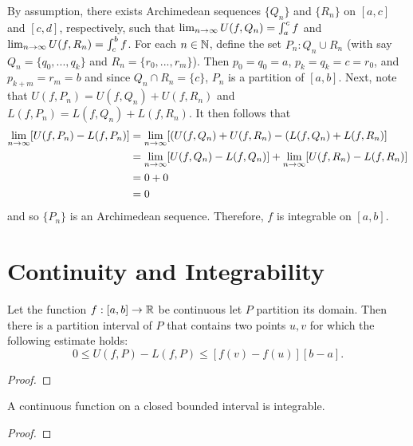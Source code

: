 \documentclass[letterpaper, twoside, 12pt]{book}
\begin{document}
\begin{solution}
    By assumption, there exists Archimedean sequences \(\{Q_n\}\) and \(\{R_n\}\) on
    \([a, c]\) and \([c, d]\), respectively, such that \(\lim_{n \to \infty} U(f, Q_n) = \int_a^c f\)
    and \(\lim_{n \to \infty} U(f, R_n) = \int_c^b f\). For each \(n \in \mathbb N\), define the
    set \(P_n : Q_n \cup R_n\) (with say \(Q_n = \{q_0, ..., q_k\}\) and 
    \(R_n = \{r_0, ..., r_m\}\)). Then \(p_0 = q_0 = a\), \(p_k = q_k = c = r_0\),
    and \(p_{k+m} = r_m = b\) and since \(Q_n \cap R_n = \{c\}\), \(P_n\) is 
    a partition of \([a,b]\). Next, note that \(U(f, P_n) = U(f, Q_n) + U(f, R_n)\)
    and \(L(f, P_n) = L(f, Q_n) + L(f, R_n)\). It then follows that
    \begin{align*}
        \lim_{n \to \infty} [ U(f, P_n) - L(f, P_n) ] &= \lim_{n \to \infty} [ (U(f, Q_n) + U(f, R_n) - (L(f, Q_n) + L(f, R_n) ] \\
                &= \lim_{n \to \infty} [U(f, Q_n) - L(f, Q_n)] + \lim_{n \to \infty} [U(f, R_n) - L(f, R_n)] \\
                &= 0 + 0 \\
                &= 0 \\
    \end{align*}
    and so \(\{P_n\}\) is an Archimedean sequence. Therefore, \(f\) is integrable on \([a,b]\).
\end{solution}




\section{Continuity and Integrability}


\begin{lemma}[6.17]
  Let the function \(f:[a,b]\to\mathbb R\) be continuous let \(P\) partition
  its domain. Then there is a partition interval of \(P\) that contains two
  points \(u,v\) for which the following estimate holds:
  \[
    0
      \leq
    U(f,P)-L(f,P)
      \leq
    [f(v)-f(u)][b-a]
  .\]
\end{lemma}
\begin{proof}

\end{proof}


\begin{theorem}[6.18]
  A continuous function on a closed bounded interval is integrable.
\end{theorem}
\begin{proof}

\end{proof}
\end{document}
